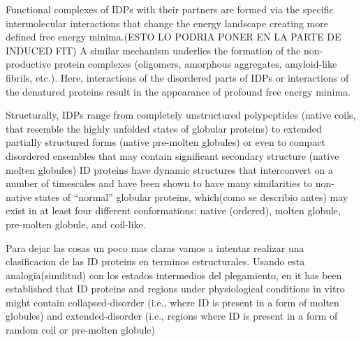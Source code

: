 Functional complexes of IDPs with their partners are formed via the specific intermolecular interactions that change the energy landscape creating more defined free energy minima.(ESTO LO PODRIA PONER EN LA PARTE DE INDUCED FIT)
A similar mechanism underlies the formation of the non-productive protein complexes (oligomers, amorphous aggregates, amyloid-like fibrils, etc.). Here, interactions of the disordered parts of IDPs or interactions of the denatured proteins result in the appearance of profound free energy minima.

Structurally, IDPs range from completely unstructured polypeptides (native coils, that resemble the highly unfolded states of globular proteins) to extended partially structured forms (native pre-molten globules) or even to compact disordered ensembles that may contain significant secondary structure (native molten globules)
ID proteins have dynamic structures that interconvert on a number of timescales and have been shown to have many similarities to non-native states of “normal” globular proteins, which(como se describio antes) may exist in at least four different conformations: native (ordered), molten globule, pre-molten globule, and coil-like.


Para dejar las cosas un poco mas claras vamos a intentar realizar una clasificacion de las ID proteins en terminos estructurales.
Usando esta analogia(similitud) con los estados intermedios del plegamiento, en \cite{uversky2010understanding} it has been established that ID proteins and regions under physiological conditions in vitro might 
contain collapsed-disorder (i.e., where ID is present in a form of molten globules) and extended-disorder (i.e., regions where ID is present in a form of random coil or pre-molten globule)

